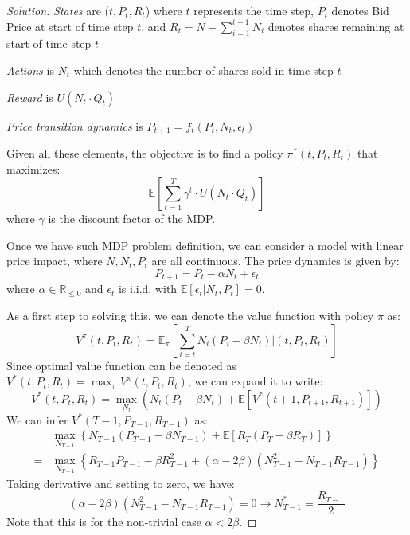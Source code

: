 \documentclass[12pt]{article}
\newenvironment{solution}
  {\renewcommand\qedsymbol{$\blacksquare$}\begin{proof}[Solution]}
  {\end{proof}}
\begin{document}
\begin{solution}
\textit{States} are ($t, P_t, R_t$) where $t$ represents the time step, $P_t$ denotes Bid Price at start of time step $t$, and $R_t = N - \sum_{i=1}^{t-1}N_i$ denotes shares remaining at start of time step $t$

\textit{Actions} is $N_t$ which denotes the number of shares sold in time step $t$

\textit{Reward} is $U(N_t \cdot Q_t)$

\textit{Price transition dynamics} is $P_{t+1} = f_t(P_t, N_t, \epsilon_t)$

Given all these elements, the objective is to find a policy $\pi^\ast(t, P_t, R_t)$ that maximizes:
\begin{equation}
\mathbb{E}[\sum_{t=1}^{T}\gamma^t \cdot U(N_t \cdot Q_t)]
\end{equation}
where $\gamma$ is the discount factor of the \gls{MDP}.

Once we have such \gls{MDP} problem definition, we can consider a model with linear price impact, where $N, N_t, P_t$ are all continuous. The price dynamics is given by:
\begin{equation}
P_{t+1} = P_t - \alpha N_t + \epsilon_t
\end{equation}
where $\alpha \in \mathbb{R}_{\leq0}$ and $\epsilon_t$ is i.i.d. with $\mathbb{E}[\epsilon_t \vert N_t, P_t] = 0$.

As a first step to solving this, we can denote the value function with policy $\pi$ as:
\begin{equation}
V^{\pi}\left(t, P_{t}, R_{t}\right)=\mathbb{E}_{\pi}\left[\sum_{i=t}^{T} N_{i}\left(P_{i}-\beta N_{i}\right) |\left(t, P_{t}, R_{t}\right)\right]
\end{equation}
Since optimal value function can be denoted as $V^{*}\left(t, P_{t}, R_{t}\right)=\max _{\pi} V^{\pi}\left(t, P_{t}, R_{t}\right)$, we can expand it to write:
\begin{equation}
V^{*}\left(t, P_{t}, R_{t}\right)=\max _{N_{t}}\left(N_{t}\left(P_{t}-\beta N_{t}\right)+\mathbb{E}\left[V^{*}\left(t+1, P_{t+1}, R_{t+1}\right)\right]\right)
\end{equation}
We can infer $V^{*}\left(T-1, P_{T-1}, R_{T-1}\right)$ as:
\begin{align}
& \max _{N_{T-1}}\left\{N_{T-1}\left(P_{T-1}-\beta N_{T-1}\right)+\mathbb{E}\left[R_{T}\left(P_{T}-\beta R_{T}\right)\right]\right\} \\
=& \max _{N_{T-1}}\left\{R_{T-1} P_{T-1}-\beta R_{T-1}^{2}+(\alpha-2 \beta)\left(N_{T-1}^{2}-N_{T-1} R_{T-1}\right)\right\}
\end{align}
Taking derivative and setting to zero, we have:
\begin{equation}
\label{eq:Nt-1}
	(\alpha-2 \beta)\left(N_{T-1}^{2}-N_{T-1} R_{T-1}\right) = 0 \rightarrow N^\ast_{T-1} = \frac{R_{T-1}}{2}
\end{equation}
Note that this is for the non-trivial case $\alpha < 2\beta$. 


\end{solution}
\end{document}
